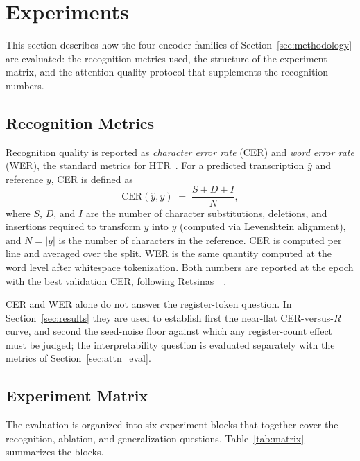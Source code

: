 \section{Experiments}
\label{sec:experiments}

This section describes how the four encoder families of Section~\ref{sec:methodology} are evaluated: the recognition metrics used, the structure of the experiment matrix, and the attention-quality protocol that supplements the recognition numbers.

\subsection{Recognition Metrics}
\label{sec:metrics_reco}

Recognition quality is reported as \emph{character error rate} (CER) and \emph{word error rate} (WER), the standard metrics for HTR~\cite{marti2002iam, retsinas2024htrbestpractices}. For a predicted transcription $\hat{y}$ and reference $y$, CER is defined as
\begin{equation}
\label{eq:cer}
\mathrm{CER}(\hat{y}, y) \;=\; \frac{S + D + I}{N},
\end{equation}
where $S$, $D$, and $I$ are the number of character substitutions, deletions, and insertions required to transform $\hat{y}$ into $y$ (computed via Levenshtein alignment), and $N = |y|$ is the number of characters in the reference. CER is computed per line and averaged over the split. WER is the same quantity computed at the word level after whitespace tokenization. Both numbers are reported at the epoch with the best validation CER, following Retsinas~\etal~\cite{retsinas2024htrbestpractices}.

CER and WER alone do not answer the register-token question. In Section~\ref{sec:results} they are used to establish first the near-flat CER-versus-$R$ curve, and second the seed-noise floor against which any register-count effect must be judged; the interpretability question is evaluated separately with the metrics of Section~\ref{sec:attn_eval}.

\subsection{Experiment Matrix}
\label{sec:matrix}

The evaluation is organized into six experiment blocks that together cover the recognition, ablation, and generalization questions. Table~\ref{tab:matrix} summarizes the blocks.

